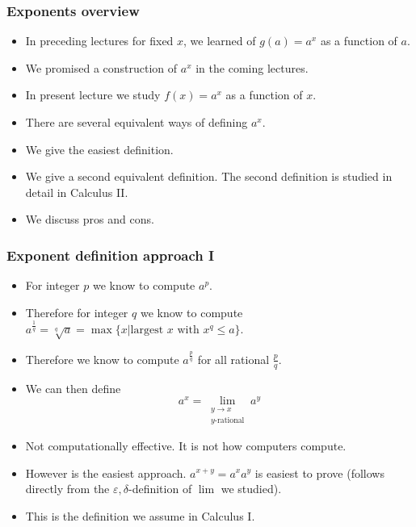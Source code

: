 \begin{frame}
\frametitle{Exponents overview}
\begin{itemize}
\item<1-> In preceding lectures for fixed $x$, we learned of $g(a) =a^{x}$ as a function of $a$.
\item<2-> We promised a construction of $a^x$ in the coming lectures.
\item<3-> In present lecture we study $f(x)=a^x$ as a function of $x$.
\item<4-> There are several equivalent ways of defining $a^x$. 
\item<5-> We give the easiest definition. 
\item<6->We give a second equivalent definition. The second definition is studied in detail in Calculus II. 
\item<7->We discuss pros and cons.
\end{itemize}
\end{frame}
\begin{frame}
\frametitle{Exponent definition approach I}
\begin{itemize}
\item<1-> For integer $p$ we know to compute $a^p$.
\item<2-> Therefore for integer $q$ we know to compute $a^{\frac{1}{q}}= \sqrt[q]{a}=\max\{x|\text{largest~}x\text{~with~} x^q\leq a\}$.
\item<3-> Therefore we know to compute $a^{\frac{p}{q}}$ for all rational $\frac{p}{q}$.
\item<4-> We can then define
\[
a^x = \lim\limits_{\substack{y \to x \\ y\text{-rational}}} a^y 
\]
\item<5-> Not computationally effective. It is not how computers compute.
\item<6-> However is the easiest approach. $a^{x+y}=a^xa^y$ is easiest to prove (follows directly from the $\varepsilon, \delta$-definition of $\lim$ we studied).
\item<7->\alert<7->{This is the definition we assume in Calculus I.}
\end{itemize}
\end{frame}
